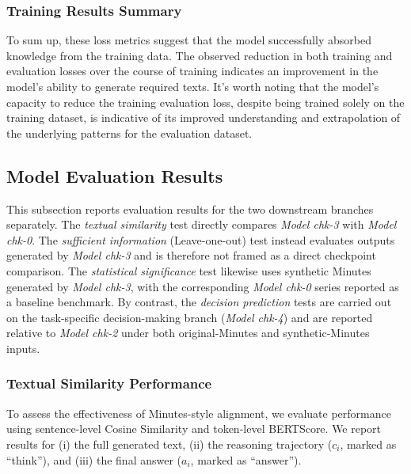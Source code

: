 \subsubsection*{Training Results Summary}

To sum up, these loss metrics suggest that the model successfully absorbed knowledge from the training data. The observed reduction in both training and evaluation losses over the course of training indicates an improvement in the model's ability to generate required texts. It's worth noting that the model's capacity to reduce the training evaluation loss, despite being trained solely on the training dataset, is indicative of its improved understanding and extrapolation of the underlying patterns for the evaluation dataset.






\subsection*{Model Evaluation Results}

This subsection reports evaluation results for the two downstream branches separately. The \textit{textual similarity} test directly compares \textit{Model chk-3} with \textit{Model chk-0}. The \textit{sufficient information} (Leave-one-out) test instead evaluates outputs generated by \textit{Model chk-3} and is therefore not framed as a direct checkpoint comparison. The \textit{statistical significance} test likewise uses synthetic Minutes generated by \textit{Model chk-3}, with the corresponding \textit{Model chk-0} series reported as a baseline benchmark. By contrast, the \textit{decision prediction} tests are carried out on the task-specific decision-making branch (\textit{Model chk-4}) and are reported relative to \textit{Model chk-2} under both original-Minutes and synthetic-Minutes inputs.


\subsubsection*{Textual Similarity Performance}

To assess the effectiveness of Minutes-style alignment, we evaluate performance using sentence-level Cosine Similarity and token-level BERTScore. We report results for (i) the full generated text, (ii) the reasoning trajectory ($c_i$, marked as ``think''), and (iii) the final answer ($a_i$, marked as ``answer'').

